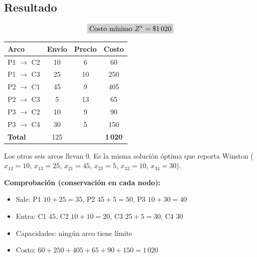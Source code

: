 \documentclass[11pt,a4paper]{article}
\newcommand{\ra}{\ensuremath{\to}}
\begin{document}
\subsection*{Resultado}
\[
\res{\text{Costo mínimo } Z^* = \$1\,020}
\]
\noindent
\begin{minipage}[c]{0.42\textwidth}\small\centering
\begin{tabular}{lccc}
\toprule
\textbf{Arco} & \textbf{Envío} & \textbf{Precio} & \textbf{Costo} \\
\midrule
P1 \ra{} C2 & 10 & 6  & 60 \\
P1 \ra{} C3 & 25 & 10 & 250 \\
P2 \ra{} C1 & 45 & 9  & 405 \\
P2 \ra{} C3 & 5  & 13 & 65 \\
P3 \ra{} C2 & 10 & 9  & 90 \\
P3 \ra{} C4 & 30 & 5  & 150 \\
\midrule
\textbf{Total} & 125 & & \textbf{1\,020} \\
\bottomrule
\end{tabular}
\end{minipage}\hfill
\begin{minipage}[c]{0.56\textwidth}\small
Los otros seis arcos llevan 0. Es la misma solución óptima que reporta Winston ($x_{12} = 10$, $x_{13} = 25$,
$x_{21} = 45$, $x_{23} = 5$, $x_{32} = 10$, $x_{34} = 30$).

\textbf{Comprobación (conservación en cada nodo):}
\begin{itemize}[itemsep=1pt, leftmargin=*]
  \item Sale: P1 $10 + 25 = 35$, P2 $45 + 5 = 50$, P3 $10 + 30 = 40$ \checkmark
  \item Entra: C1 $45$, C2 $10 + 10 = 20$, C3 $25 + 5 = 30$, C4 $30$ \checkmark
  \item Capacidades: ningún arco tiene límite \checkmark
  \item Costo: $60 + 250 + 405 + 65 + 90 + 150 = 1\,020$ \checkmark
\end{itemize}
\end{minipage}
\end{document}
